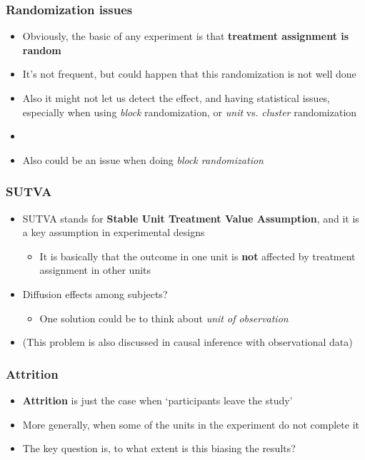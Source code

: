 \begin{frame}
\frametitle{Randomization issues}
\centering

\begin{itemize}
  \item Obviously, the basic of any experiment is that \textbf{treatment assignment is random}
  \item It's not frequent, but could happen that this randomization is not well done
  \item Also it might not let us detect the effect, and having statistical issues, especially when using \textit{block} randomization, or \textit{unit} vs. \textit{cluster} randomization
  \item[]
  \item Also could be an issue when doing \textit{block randomization}
\end{itemize}

\end{frame}
\note{}

\begin{frame}
\frametitle{SUTVA}
\centering

\begin{itemize}
  \item SUTVA stands for \textbf{Stable Unit Treatment Value Assumption}, and it is a key assumption in experimental designs
  \begin{itemize}
    \item It is basically that the outcome in one unit is \textbf{not} affected by treatment assignment in other units
  \end{itemize}
  \item Diffusion effects among subjects?
  \begin{itemize}
    \item One solution could be to think about \textit{unit of observation}
  \end{itemize}
  \item (This problem is also discussed in causal inference with observational data)
\end{itemize}

\end{frame}
\note{}

\begin{frame}
\frametitle{Attrition}
\centering

\begin{itemize}
  \item \textbf{Attrition} is just the case when `participants leave the study'
  \item More generally, when some of the units in the experiment do not complete it
  \item The key question is, to what extent is this biasing the results?
\end{itemize}

\end{frame}
\note{}

